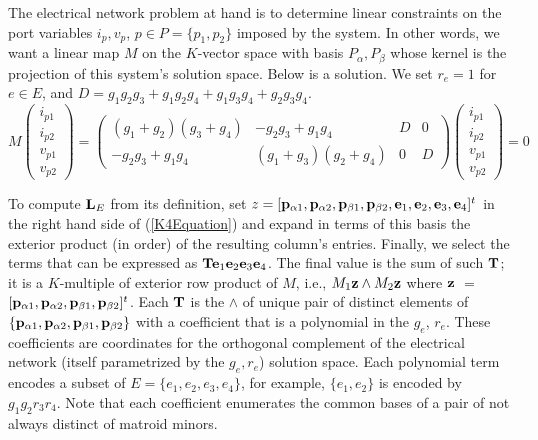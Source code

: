The electrical network problem at hand is to determine linear constraints on the
port variables $i_p, v_p$, $p\in P = \{p_1, p_2\}$ imposed by the system.  In other words,
we want a linear map $M$ on the $K$-vector space with basis $P_\alpha, P_\beta$ whose kernel
is the projection of this system's solution space.
Below is a solution.
We set $r_e=1$ for $e\in E$, and $D=g_{1} g_{2} g_{3} + g_{1} g_{2} g_{4} + g_{1} g_{3} g_{4} + g_{2} g_{3} g_{4}$.
\begin{equation}\label{K4Soln}
M\left(\begin{array}{c} i_{p1} \\ i_{p2} \\ v_{p1} \\ v_{p2}
\end{array}\right) =
\left(\begin{array}{cccc}
{\left(g_{1} + g_{2}\right)} {\left(g_{3} + g_{4}\right)} & -g_{2} g_{3} + g_{1} g_{4} & D & 0 \\
-g_{2} g_{3} + g_{1} g_{4} & {\left(g_{1} + g_{3}\right)} {\left(g_{2} + g_{4}\right)} & 0 & D
\end{array}\right)
\left(\begin{array}{c} i_{p1} \\ i_{p2} \\ v_{p1} \\ v_{p2}
\end{array}\right) = 0
\end{equation}


To compute $\mathbf{L}_E$ from its definition, set 
$z=[\mathbf{p}_{\alpha 1},\mathbf{p}_{\alpha 2},\mathbf{p}_{\beta 1},\mathbf{p}_{\beta 2},
  \mathbf{e}_1,  \mathbf{e}_2,  \mathbf{e}_3,  \mathbf{e}_4]^t$
in the right hand side of (\ref{K4Equation}) 
and expand in terms of this basis
the exterior product (in order) of the resulting column's entries.
Finally, we select
the terms that can be expressed as
$\mathbf{T}\mathbf{e}_1\mathbf{e}_2\mathbf{e}_3\mathbf{e}_4$.
The final
value is the sum of such $\mathbf{T}$; it is a $K$-multiple of exterior
row product of $M$, i.e., $M_1\mathbf{z}\wedge M_2\mathbf{z}$ where
$\mathbf{z}$ $=$ 
$[\mathbf{p}_{\alpha 1},\mathbf{p}_{\alpha 2},\mathbf{p}_{\beta 1},\mathbf{p}_{\beta 2}]^t$.
Each $\mathbf{T}$ is the $\wedge$ of unique pair of distinct elements
of $\{\mathbf{p}_{\alpha 1}, \mathbf{p}_{\alpha 2}, \mathbf{p}_{\beta 1}, \mathbf{p}_{\beta 2}\}$
with a coefficient that is a polynomial in the 
$g_e$, $r_e$.  These coefficients are \Plucker coordinates
for the orthogonal complement of the electrical network
(itself parametrized by the $g_e, r_e$) solution space.
Each polynomial
term encodes a subset of $E=\{e_1, e_2, e_3, e_4\}$, for example, $\{e_1, e_2\}$ is encoded
by $g_1g_2r_3r_4$. Note that each coefficient enumerates
the common bases of a pair of not always distinct of matroid minors.


